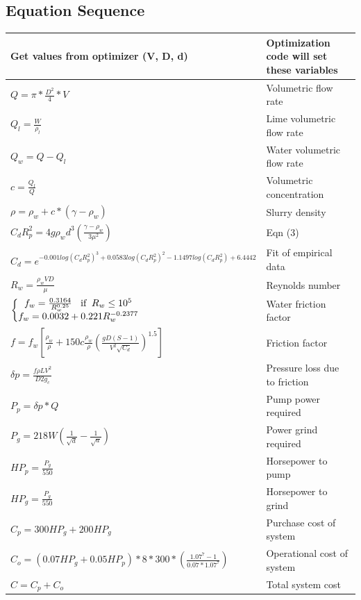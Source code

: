 \documentclass{article}
\begin{document}
\subsection{Equation Sequence}
\begin{center}
	\begin{tabular}{|l|l|}
		\hline
		Get values from optimizer (V, D, d) & Optimization code will set these variables \\ 
		\hline
		$Q = \pi * \frac{D^{2}}{4} * V$ & Volumetric flow rate \\ 
		\hline
		$Q_{l} = \frac{W}{\rho_{l}}$ & Lime volumetric flow rate \\ 
		\hline
		$Q_{w} = Q - Q_{l}$ & Water volumetric flow rate \\ 
		\hline
		$c = \frac{Q_{l}}{Q}$ & Volumetric concentration \\ 
		\hline
		$\rho = \rho_{w} + c * (\gamma - \rho_{w})$ & Slurry density \\ 
		\hline
		$C_{d}R_{p}^{2} = 4  g  \rho_{w}  d^{3}\left ( \frac{\gamma - \rho_{w}}{3\mu^{2}}\right )$ & Eqn (3) \\ 
		\hline
		$C_{d} = e^{-0.001 log(C_{d}R_{p}^{2})^3 + 0.0583 log(C_{d}R_{p}^{2})^2 - 1.1497 log(C_{d}R_{p}^{2}) + 6.4442}$ & Fit of empirical data \\ 
		\hline
		$R_w = \frac{\rho_w V D}{\mu}$ & Reynolds number \\ 
		\hline
		$\left\{\begin{matrix}f_w = \frac{0.3164}{R_w^{0.25}} \text{ \: if \:} R_w \leq 10^5\\f_w = 0.0032+0.221R_w^{-0.2377}\end{matrix}\right.$ & Water friction factor \\ 
		\hline
		$f = f_w \left [\frac{\rho_w}{\rho} + 150 c \frac{\rho_w}{\rho}\left (\frac{g D (S -1)}{V^2 \sqrt{C_d}} \right )^{1.5} \right ]$ & Friction factor \\ 
		\hline
		$\delta p = \frac{f \rho L V^2}{D 2 g_c}$  & Pressure loss due to friction \\
		\hline 
		$P_p = \delta p * Q$& Pump power required \\ 
		\hline
		$P_g = 218 W \left ( \frac{1}{\sqrt{d}} - \frac{1}{\sqrt{a}} \right )$& Power grind required \\ 
		\hline
		$HP_p = \frac{P_g}{550}$& Horsepower to pump  \\ 
		\hline
		$HP_g = \frac{P_g}{550}$& Horsepower to grind \\ 
		\hline
		$C_p = 300 HP_g + 200 HP_g$& Purchase cost of system \\ 
		\hline
		$C_o = (0.07 HP_g + 0.05 HP_p) * 8 * 300 *\left ( \frac{1.07^7 - 1}{0.07 * 1.07^7} \right)$& Operational cost of system \\ 
		\hline
		$C = C_p + C_o$& Total system cost \\ 
		\hline
		
	\end{tabular} 
\end{center}
\end{document}
